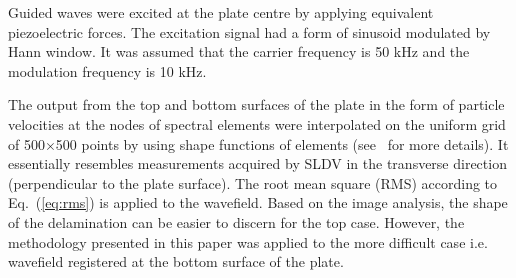 Guided waves were excited at the plate centre by applying equivalent piezoelectric forces.
The excitation signal had a form of sinusoid modulated by Hann window. 
It was assumed that the carrier frequency is 50 kHz and the modulation frequency is 10 kHz.

The output from the top and bottom surfaces of the plate in the form of particle velocities at the nodes of spectral elements were interpolated on the uniform grid of 500\(\times\)500 points by using shape functions of elements (see~\cite{Kudela2020} for more details).
It essentially resembles measurements acquired by SLDV in the transverse direction (perpendicular to the plate surface). 
The root mean square (RMS) according to Eq.~(\ref{eq:rms}) is applied to the wavefield.
Based on the image analysis, the shape of the delamination can be easier to discern for the top case.
However, the methodology presented in this paper was applied to the more difficult case i.e. wavefield registered at the bottom surface of the plate.

%

